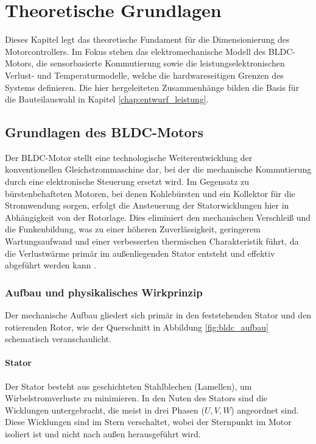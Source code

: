 \chapter{Theoretische Grundlagen}
\label{chap:grundlagen}

Dieses Kapitel legt das theoretische Fundament für die Dimensionierung des Motorcontrollers. Im Fokus stehen das elektromechanische Modell des BLDC-Motors, die sensorbasierte Kommutierung sowie die leistungselektronischen Verlust- und Temperaturmodelle, welche die hardwareseitigen Grenzen des Systems definieren. Die hier hergeleiteten Zusammenhänge bilden die Basis für die Bauteilauswahl in Kapitel \ref{chap:entwurf_leistung}.

\section{Grundlagen des BLDC-Motors}
\label{sec:bldc_motor}

Der BLDC-Motor stellt eine technologische Weiterentwicklung der konventionellen Gleichstrommaschine dar, bei der die mechanische Kommutierung durch eine elektronische Steuerung ersetzt wird. Im Gegensatz zu bürstenbehafteten Motoren, bei denen Kohlebürsten und ein Kollektor für die Stromwendung sorgen, erfolgt die Ansteuerung der Statorwicklungen hier in Abhängigkeit von der Rotorlage. Dies eliminiert den mechanischen Verschleiß und die Funkenbildung, was zu einer höheren Zuverlässigkeit, geringerem Wartungsaufwand und einer verbesserten thermischen Charakteristik führt, da die Verlustwärme primär im außenliegenden Stator entsteht und effektiv abgeführt werden kann \cite[S.~9]{MPS_BLDC_AN}.

\subsection{Aufbau und physikalisches Wirkprinzip}
Der mechanische Aufbau gliedert sich primär in den feststehenden Stator und den rotierenden Rotor, wie der Querschnitt in Abbildung \ref{fig:bldc_aufbau} schematisch veranschaulicht.

\subsubsection{Stator}
Der Stator besteht aus geschichteten Stahlblechen (Lamellen), um Wirbelstromverluste zu minimieren. In den Nuten des Stators sind die Wicklungen untergebracht, die meist in drei Phasen ($U, V, W$) angeordnet sind. Diese Wicklungen sind im Stern verschaltet, wobei der Sternpunkt im Motor isoliert ist und nicht nach außen herausgeführt wird.

